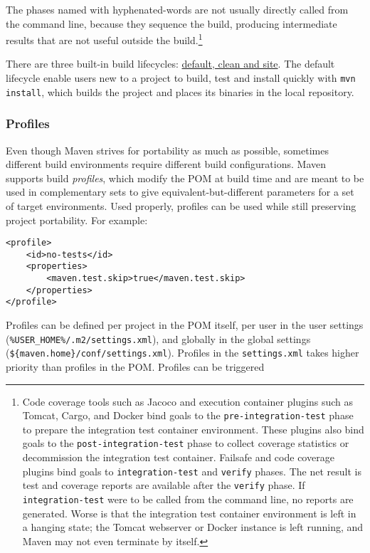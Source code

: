 \documentclass[8pt, table, xcdraw]{article}%
\begin{document}
The phases named with hyphenated-words are not usually directly called from the command line, because they sequence the build, producing intermediate results that are not useful outside the build.\footnote{Code coverage tools such as Jacoco and execution container plugins such as Tomcat, Cargo, and Docker bind goals to the \lstinline{pre-integration-test} phase to prepare the integration test container environment. These plugins also bind goals to the \lstinline{post-integration-test} phase to collect coverage statistics or decommission the integration test container. Failsafe and code coverage plugins bind goals to \lstinline{integration-test} and \lstinline{verify} phases. The net result is test and coverage reports are available after the \lstinline{verify} phase. If \lstinline{integration-test} were to be called from the command line, no reports are generated. Worse is that the integration test container environment is left in a hanging state; the Tomcat webserver or Docker instance is left running, and Maven may not even terminate by itself.}

There are three built-in build lifecycles: \href{https://maven.apache.org/guides/introduction/introduction-to-the-lifecycle.html#Lifecycle_Reference}{default, clean and site}. The default lifecycle enable users new to a project to build, test and install quickly with \lstinline{mvn install}, which builds the project and places its binaries in the local repository.

\subsubsection{Profiles}

Even though Maven strives for portability as much as possible, sometimes different build environments require different build configurations. Maven supports build \emph{profiles}, which modify the POM at build time and are meant to be used in complementary sets to give equivalent-but-different parameters for a set of target environments. Used properly, profiles can be used while still preserving project portability. For example:

\begin{lstlisting}
<profile>
    <id>no-tests</id>
    <properties>
        <maven.test.skip>true</maven.test.skip>
    </properties>
</profile>
\end{lstlisting}

Profiles can be defined per project in the POM itself, per user in the user settings (\lstinline{%USER_HOME%/.m2/settings.xml}), and globally in the global settings (\lstinline|${maven.home}/conf/settings.xml|). Profiles in the \lstinline{settings.xml} takes higher priority than profiles in the POM. Profiles can be triggered
\end{document}
